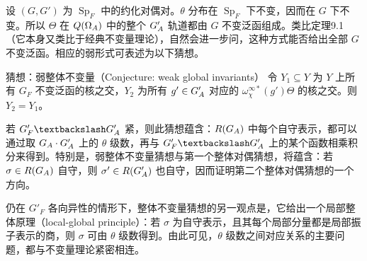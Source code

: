 设 $(G,G')$ 为 $\operatorname{Sp}_F$ 中的约化对偶对。$\theta$ 分布在 $\operatorname{Sp}_F$ 下不变，因而在 $G$ 下不变。所以 $\Theta$ 在 $Q(\Omega_A)$ 中的整个 $G'_A$ 轨道都由 $G$ 不变泛函组成。类比定理9.1（它本身又类比于经典不变量理论），自然会进一步问，这种方式能否给出全部 $G$ 不变泛函。相应的弱形式可表述为以下猜想。
\begin{originaltheorem}{猜想：弱整体不变量（Conjecture: weak global invariants）}
令 $Y_1\subseteq Y$ 为 $Y$ 上所有 $G_F$ 不变泛函的核之交，$Y_2$ 为所有 $g'\in G'_A$ 对应的 $\omega_\chi^{\infty *}(g')\Theta$ 的核之交。则 $Y_2=Y_1$。
\end{originaltheorem}
若 $G_F'\backslash\widetilde G'_\A$ 紧，则此猜想蕴含：$R(G_A)$ 中每个自守表示，都可以通过取 $G_A\cdot G'_A$ 上的 $\theta$ 级数，再与 $G'_F\backslash\widetilde G'_\A$ 上的某个函数相乘积分来得到。特别是，弱整体不变量猜想与第一个整体对偶猜想，将蕴含：若 $\sigma\in R(G_A)$ 自守，则 $\sigma'\in R(G'_A)$ 也自守，因而证明第二个整体对偶猜想的一个方向。

仍在 $G'_F$ 各向异性的情形下，整体不变量猜想的另一观点是，它给出一个局部整体原理（local-global principle）：若 $\sigma$ 为自守表示，且其每个局部分量都是局部振子表示的商，则 $\sigma$ 可由 $\theta$ 级数得到。由此可见，$\theta$ 级数之间对应关系的主要问题，都与不变量理论紧密相连。

